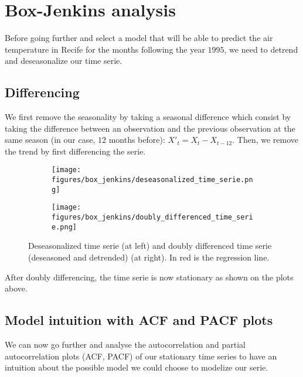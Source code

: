 \section{Box-Jenkins analysis} 

Before going further and select a model that will be able to predict the air temperature in Recife for the months following the year $1995$, we need to detrend and deseasonalize our time serie. 


\subsection{Differencing}

We first remove the seasonality by taking a seasonal difference which consist by taking the difference between an observation and the previous observation at the same season (in our case, $12$ months before): $X'_t = X_t - X_{t-12}$. 
Then, we remove the trend by first differencing the serie.

\begin{figure}[H]
	\centering
	\begin{subfigure}{0.49\textwidth}
		\centering
		\texttt{[image: figures/box\_jenkins/deseasonalized\_time\_serie.png]}
		\label{fig:deseasonalized-time-serie}
	\end{subfigure}
	\begin{subfigure}{0.49\textwidth}
		\centering
		\texttt{[image: figures/box\_jenkins/doubly\_differenced\_time\_serie.png]}
		\label{fig:doubly-differenced-time-serie}
	\end{subfigure}
	\caption{Deseasonalized time serie (at left) and doubly differenced time serie (deseasoned and detrended) (at right). In red is the regression line.}
\end{figure}

After doubly differencing, the time serie is now stationary as shown on the plots above.

\subsection{Model intuition with ACF and PACF plots}

We can now go further and analyse the autocorrelation and partial autocorrelation plots (ACF, PACF) of our stationary time series to have an intuition about the possible model we could choose to modelize our serie.

